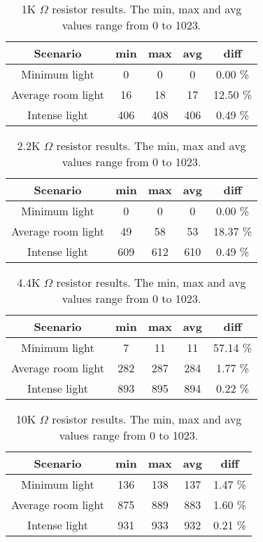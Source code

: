 \begin{table}[htbp]
  \centering
  \begin{tabular}{c c c c c}
    \toprule
    Scenario & min & max & avg & diff \\ \midrule
    Minimum light & 0 & 0 & 0 & 0.00 \% \\
    Average room light & 16 & 18 & 17 & 12.50 \% \\
    Intense light & 406 & 408 & 406 & 0.49 \% \\ \bottomrule
  \end{tabular}
  \caption[1K $\Omega$ resistor results]{1K $\Omega$ resistor results. The min, max and avg values range from 0 to 1023.}\label{tab:1KTestResults}
\end{table}

\begin{table}[htbp]
  \centering
  \begin{tabular}{c c c c c}
    \toprule
    Scenario & min & max & avg & diff \\ \midrule
    Minimum light & 0 & 0 & 0 & 0.00 \% \\
    Average room light & 49 & 58 & 53 & 18.37 \% \\
    Intense light & 609 & 612 & 610 & 0.49 \% \\ \bottomrule
  \end{tabular}
  \caption[2.2K $\Omega$ resistor results]{2.2K $\Omega$ resistor results. The min, max and avg values range from 0 to 1023.}\label{tab:2.2KTestResults}
\end{table}

\begin{table}[htbp]
  \centering
  \begin{tabular}{c c c c c}
    \toprule
    Scenario & min & max & avg & diff \\ \midrule
    Minimum light & 7 & 11 & 11 & 57.14 \% \\
    Average room light & 282 & 287 & 284 & 1.77 \% \\
    Intense light & 893 & 895 & 894 & 0.22 \% \\ \bottomrule
  \end{tabular}
  \caption[4.4K $\Omega$ resistor results]{4.4K $\Omega$ resistor results. The min, max and avg values range from 0 to 1023.}\label{tab:4.4KTestResults}
\end{table}

\begin{table}[htbp]
  \centering
  \begin{tabular}{c c c c c}
    \toprule
    Scenario & min & max & avg & diff \\ \midrule
    Minimum light & 136 & 138 & 137 & 1.47 \% \\
    Average room light & 875 & 889 & 883 & 1.60 \% \\
    Intense light & 931 & 933 & 932 & 0.21 \% \\ \bottomrule
  \end{tabular}
  \caption[10K $\Omega$ resistor results]{10K $\Omega$ resistor results. The min, max and avg values range from 0 to 1023.}\label{tab:10KTestResults}
\end{table}

